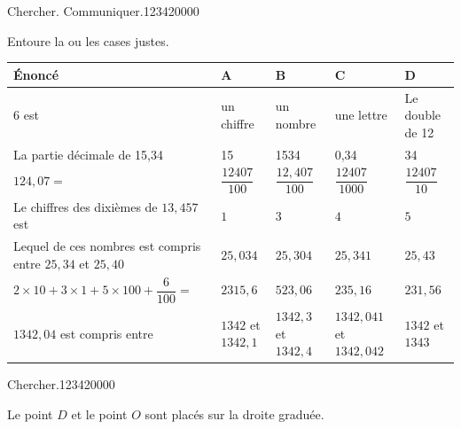 \begin{pageAuto} 

 
\begin{ExoAuto}{Chercher. Communiquer.}{1234}{2}{0}{0}{0}{0}

Entoure la ou les cases justes.

\begin{tabularx}{\linewidth}{|p{6cm}|X|X|X|X|}
\hline 
Énoncé & A & B & C & D \\ 
\hline 
$6$ est  & un chiffre &  un nombre & une lettre & Le double de 12 \\ 
\hline 
La partie décimale de 15,34 & 15 & 1534 & 0,34 & 34 \\ 
\hline
$124,07=$ & $\dfrac{12407}{100}$ &  $\dfrac{12,407}{100}$ &  $\dfrac{12407}{1000}$ &  $\dfrac{12407}{10}$  \\ 
\hline 
Le chiffres des dixièmes de $13,457$ est  & $1$ & $3$ & $4$ & $5$ \\ 
\hline 
Lequel de ces nombres est compris entre $25,34$ et $25,40 $ & $25,034$ & $25,304$ & $25,341$ & $25,43$ \\ 
\hline 
 $2\times 10 +3\times 1+5\times 100 +\dfrac{6}{100}=$ & $2315,6$ &  $523,06$ &  $235,16$ &  $231,56$ \vspace{0.3cm} \\ 
\hline 
 $1342,04$ est compris entre & $1342$ et $1342,1$ &  $1342,3$ et  $1342,4$ & $1342,041$  et  $1342,042$&  $1342$ et $1343$ \\ 
\hline
\end{tabularx} 

\end{ExoAuto}
 
\begin{ExoAuto}{Chercher.}{1234}{2}{0}{0}{0}{0}

 Le point $D$ et le point $O$ sont placés sur la droite graduée.
 

\end{ExoAuto}
\end{pageAuto}
